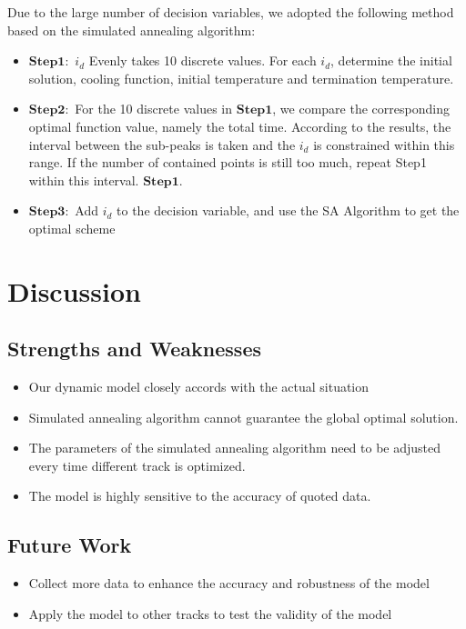 \documentclass{mcmthesis}
\begin{document}
Due to the large number of decision variables, we adopted the following method based on the simulated annealing algorithm:
\begin{itemize}
	\setlength{\itemsep}{0pt}
	\setlength{\parsep}{0pt}
	\setlength{\parskip}{0pt}
	\item  $\boldsymbol{Step1:}$ $i_d$ Evenly takes 10 discrete values. For each $i_d$, determine the initial solution, cooling function, initial temperature and termination temperature.
	\item  $\boldsymbol{Step2:}$ For the 10 discrete values in $\boldsymbol{Step1}$, we compare the corresponding optimal function value, namely the total time. According to the results, the interval between the sub-peaks is taken and the $i_d$ is constrained within this range. If the number of contained points is still too much, repeat Step1 within this interval. $\boldsymbol{Step1}$.
	
	\item  $\boldsymbol{Step3:}$ Add $i_d$ to the decision variable, and use the SA Algorithm to get the optimal scheme
\end{itemize}

\section{Discussion}
\subsection{Strengths and Weaknesses}
\begin{itemize}
	\item Our dynamic model closely accords with the actual situation
\end{itemize}
\begin{itemize}
	\item Simulated annealing algorithm cannot guarantee the global optimal solution.
	\item The parameters of the simulated annealing algorithm need to be adjusted every time different track is optimized.
	\item The model is highly sensitive to the accuracy of quoted data.
\end{itemize}
\subsection{Future Work}
\begin{itemize}
	\item  Collect more data to enhance the accuracy and robustness of the model
	\item  Apply the model to other tracks to test the validity of the model
\end{itemize}
\end{document}
